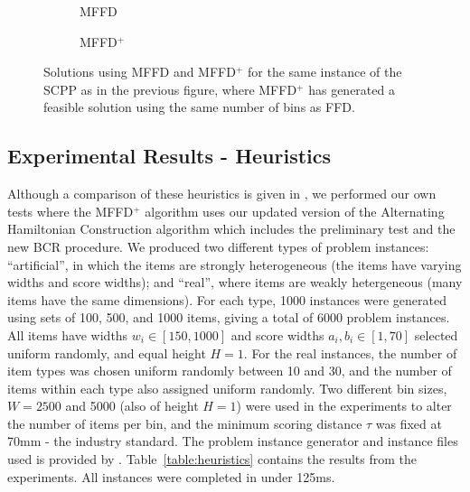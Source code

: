 \documentclass[authoryear]{elsarticle}
\begin{document}
\begin{figure}[H]	
	\centering
	\begin{subfigure}[h]{0.35\textwidth}
		
		\caption{MFFD}
		\label{fig:mffd}
	\end{subfigure} \hspace{15mm}
	\begin{subfigure}[h]{0.35\textwidth}
		
		\caption{MFFD$^+$}
		\label{fig:mffdplus}
	\end{subfigure}
	\caption{Solutions using MFFD and MFFD$^+$ for the same instance of the SCPP as in the previous figure, where MFFD$^+$ has generated a feasible solution using the same number of bins as FFD.}
	\label{fig:mffdvsmffdplus}
\end{figure}


\subsection{Experimental Results - Heuristics}
\label{sub:expheuristics}
\noindent Although a comparison of these heuristics is given in \citet{hawa2018}, we performed our own tests where the MFFD$^+$ algorithm uses our updated version of the Alternating Hamiltonian Construction algorithm which includes the preliminary test and the new BCR procedure. We produced two different types of problem instances: ``artificial'', in which the items are strongly heterogeneous (the items have varying widths and score widths); and ``real'', where items are weakly hetergeneous (many items have the same dimensions). For each type, 1000 instances were generated using sets of 100, 500, and 1000 items, giving a total of 6000 problem instances. All items have widths $w_i \in [150,1000]$ and score widths $a_i, b_i \in [1,70]$ selected uniform randomly, and equal height $H=1$. For the real instances, the number of item types was chosen uniform randomly between 10 and 30, and the number of items within each type also assigned uniform randomly. Two different bin sizes, $W = 2500$ and 5000 (also of height $H=1$) were used in the experiments to alter the number of items per bin, and the minimum scoring distance $\tau$ was fixed at 70mm - the industry standard. The problem instance generator and instance files used is provided by \citet{hawa2019}. Table~\ref{table:heuristics} contains the results from the experiments. All instances were completed in under 125ms.

\end{document}
